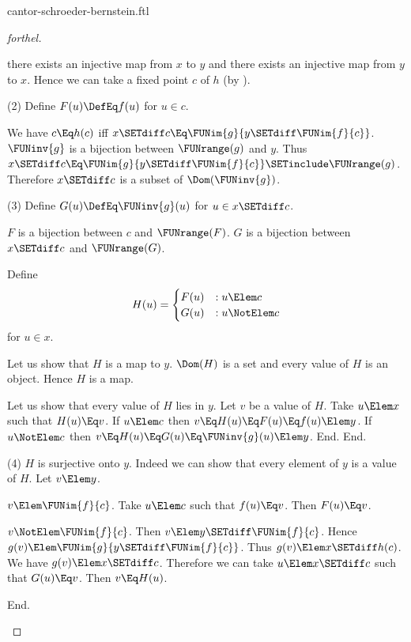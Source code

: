 \documentclass{stex}
\begin{document}
\begin{smodule}{cantor-schroeder-bernstein.ftl}
\begin{proof}[forthel]
\begin{case}{there exists an injective map from $x$ to $y$ and there exists an injective map from $y$ to $x$.}
    Hence we can take a fixed point $c$ of $h$ (by ).

    (2) Define $F(u) \DefEq f(u)$ for $u \in c$.

    We have $c \Eq h(c)$ iff $x \SETdiff c \Eq \FUNim{g}{y \SETdiff \FUNim{f}{c}}$.
    $\FUNinv{g}$ is a bijection between $\FUNrange(g)$ and $y$.
    Thus $x \SETdiff c \Eq \FUNim{g}{y \SETdiff \FUNim{f}{c}} \SETinclude \FUNrange(g)$.
    Therefore $x \SETdiff c$ is a subset of $\Dom(\FUNinv{g})$.

    (3) Define $G(u) \DefEq \FUNinv{g}(u)$ for $u \in x \SETdiff c$.

    $F$ is a bijection between $c$ and $\FUNrange(F)$.
    $G$ is a bijection between $x \SETdiff c$ and $\FUNrange(G)$.

    Define \[ H(u) =
      \begin{cases}
        F(u) & : u \Elem c \\
        G(u) & : u \NotElem c
      \end{cases} \]
    for $u \in x$.

    Let us show that $H$ is a map to $y$.
      $\Dom(H)$ is a set and every value of $H$ is an object.
      Hence $H$ is a map.

      Let us show that every value of $H$ lies in $y$.
        Let $v$ be a value of $H$.
        Take $u \Elem x$ such that $H(u) \Eq v$.
        If $u \Elem c$ then $v \Eq H(u) \Eq F(u) \Eq f(u) \Elem y$.
        If $u \NotElem c$ then $v \Eq H(u) \Eq G(u) \Eq \FUNinv{g}(u) \Elem y$.
      End.
    End.

    (4) $H$ is surjective onto $y$.
    Indeed we can show that every element of $y$ is a value of $H$.
      Let $v \Elem y$.

      \begin{case}{$v \Elem \FUNim{f}{c}$.}
        Take $u \Elem c$ such that $f(u) \Eq v$.
        Then $F(u) \Eq v$.
      \end{case}

      \begin{case}{$v \NotElem \FUNim{f}{c}$.}
        Then $v \Elem y \SETdiff \FUNim{f}{c}$.
        Hence $g(v) \Elem \FUNim{g}{y \SETdiff \FUNim{f}{c}}$.
        Thus $g(v) \Elem\linebreak x \SETdiff h(c)$.
        We have $g(v) \Elem x \SETdiff c$.
        Therefore we can take $u \Elem x \SETdiff c$ such that $G(u) \Eq v$.
        Then $v \Eq H(u)$.
      \end{case}
    End.


\end{case}
\end{proof}
\end{smodule}
\end{document}
